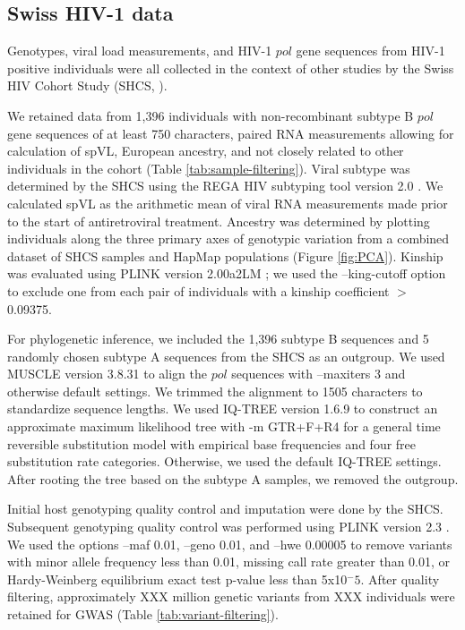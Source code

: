 \documentclass[]{article}
\begin{document}
\begin{doublespace}
\subsection{Swiss HIV-1 data}

Genotypes, viral load measurements, and HIV-1 $pol$ gene sequences from HIV-1 positive individuals were all collected in the context of other studies by the Swiss HIV Cohort Study (SHCS, \citealt{Schoeni-Affolter2010}). 

We retained data from 1,396 individuals with non-recombinant subtype B $pol$ gene sequences of at least 750 characters, paired RNA measurements allowing for calculation of spVL, European ancestry, and not closely related to other individuals in the cohort (Table \ref{tab:sample-filtering}). Viral subtype was determined by the SHCS using the REGA HIV subtyping tool version 2.0 \parencite{DeOliveira2005}. We calculated spVL as the arithmetic mean of viral RNA measurements made prior to the start of antiretroviral treatment. Ancestry was determined by plotting individuals along the three primary axes of genotypic variation from a combined dataset of SHCS samples and HapMap populations (Figure \ref{fig:PCA}). Kinship was evaluated using PLINK version 2.00a2LM \parencite{Chang2015}; we used the --king-cutoff option to exclude one from each pair of individuals with a kinship coefficient $>$ 0.09375. 

For phylogenetic inference, we included the 1,396 subtype B sequences and 5 randomly chosen subtype A sequences from the SHCS as an outgroup. We used MUSCLE version 3.8.31 \parencite{edgar_muscle:_2004} to align the $pol$ sequences with --maxiters 3 and otherwise default settings. We trimmed the alignment to 1505 characters to standardize sequence lengths. We used IQ-TREE version 1.6.9 to construct an approximate maximum likelihood tree with -m GTR+F+R4 for a general time reversible substitution model with empirical base frequencies and four free substitution rate categories. Otherwise, we used the default IQ-TREE settings. After rooting the tree based on the subtype A samples, we removed the outgroup.

Initial host genotyping quality control and imputation were done by the SHCS. Subsequent genotyping quality control was performed using PLINK version 2.3 \parencite{Chang2015}. We used the options --maf 0.01, --geno 0.01, and --hwe 0.00005 to remove variants with minor allele frequency less than 0.01, missing call rate greater than 0.01, or Hardy-Weinberg equilibrium exact test p-value less than 5x10$^-5$. After quality filtering, approximately XXX million genetic variants from XXX individuals were retained for GWAS (Table \ref{tab:variant-filtering}). 


\end{doublespace}
\end{document}
